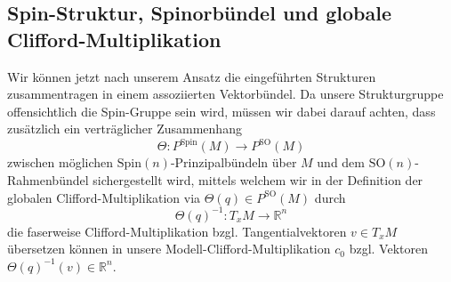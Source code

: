 \documentclass[10pt, letterpaper]{article}
\newcommand{\R}{\mathbb{R}}
\newcommand{\SO}{\mathrm{SO}}
\newcommand{\Spin}{\mathrm{Spin}}
\begin{document}
\subsection{Spin-Struktur, Spinorbündel und globale Clifford-Multiplikation}


Wir können jetzt nach unserem Ansatz die eingeführten Strukturen zusammentragen in einem assoziierten Vektorbündel. Da unsere Strukturgruppe offensichtlich die Spin-Gruppe sein wird, müssen wir dabei darauf achten, dass zusätzlich ein verträglicher Zusammenhang 
$$\Theta: P^\Spin(M)\to P^\SO(M)$$
zwischen möglichen $\Spin(n)$-Prinzipalbündeln über $M$ und dem $\SO(n)$-Rahmenbündel sichergestellt wird, mittels welchem wir in der Definition der globalen Clifford-Multiplikation via $\Theta(q)\in P^\SO(M)$ durch 
$$\Theta(q)^{-1}:T_xM\to \R^n$$
die faserweise Clifford-Multiplikation bzgl. Tangentialvektoren $v\in T_xM$ übersetzen können in unsere Modell-Clifford-Multiplikation $c_0$ bzgl. Vektoren $\Theta(q)^{-1}(v)\in\R^n$.
\end{document}
